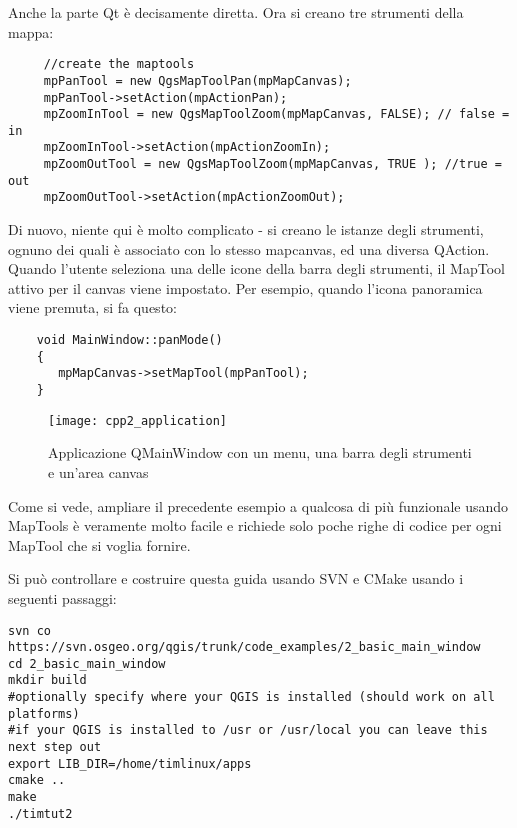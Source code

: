 Anche la parte Qt è decisamente diretta. Ora si creano tre strumenti della mappa:

\begin{verbatim}
     //create the maptools
     mpPanTool = new QgsMapToolPan(mpMapCanvas);
     mpPanTool->setAction(mpActionPan);
     mpZoomInTool = new QgsMapToolZoom(mpMapCanvas, FALSE); // false = in
     mpZoomInTool->setAction(mpActionZoomIn);
     mpZoomOutTool = new QgsMapToolZoom(mpMapCanvas, TRUE ); //true = out
     mpZoomOutTool->setAction(mpActionZoomOut);
\end{verbatim}

Di nuovo, niente qui è molto complicato - si creano le istanze degli strumenti, ognuno dei quali è associato con lo stesso mapcanvas, ed una diversa QAction. Quando l'utente seleziona una delle icone della barra degli strumenti, il MapTool attivo per il canvas viene impostato. Per esempio, quando l'icona panoramica viene premuta, si fa questo:

\begin{verbatim}
    void MainWindow::panMode()
    {
       mpMapCanvas->setMapTool(mpPanTool); 
    }
\end{verbatim}

\begin{figure}[ht]
   \begin{center}
   \caption{Applicazione QMainWindow con un menu, una barra degli strumenti e un'area canvas
\osxcaption}\label{fig:cpp2_application}\smallskip
   \texttt{[image: cpp2\_application]}
\end{center}
\end{figure}


Come si vede, ampliare il precedente esempio a qualcosa di più funzionale usando MapTools è veramente molto facile e richiede solo poche righe di codice per ogni MapTool che si voglia fornire.

Si può controllare e costruire questa guida usando SVN e CMake usando i seguenti passaggi:

\begin{verbatim}
svn co https://svn.osgeo.org/qgis/trunk/code_examples/2_basic_main_window
cd 2_basic_main_window
mkdir build
#optionally specify where your QGIS is installed (should work on all platforms)
#if your QGIS is installed to /usr or /usr/local you can leave this next step out
export LIB_DIR=/home/timlinux/apps
cmake ..
make
./timtut2
\end{verbatim}


